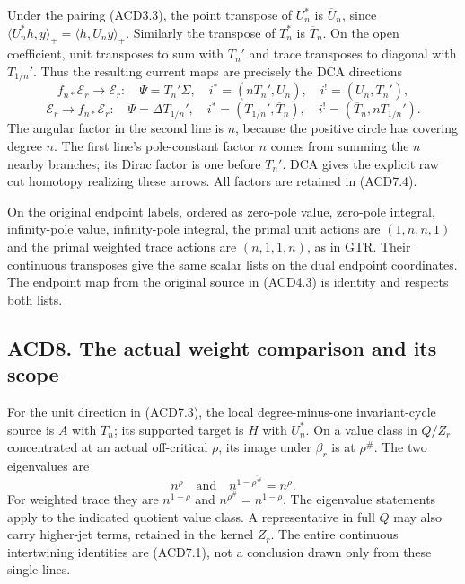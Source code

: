 Under the pairing (ACD3.3), the point transpose of \(U_n^*\) is
\(\overline U_n\), since
\(\langle U_n^*h,y\rangle_+=\langle h,U_ny\rangle_+\). Similarly the
transpose of \(T_n^*\) is \(\overline T_n\). On the open coefficient,
unit transposes to sum with \(T_n'\) and trace transposes to diagonal
with \(T_{1/n}'\). Thus the resulting current maps are precisely the DCA
directions \[
f_{n*}\mathscr E_r\to\mathscr E_r:
\quad\Psi=T_n'\Sigma,\quad i^*=(nT_n',\overline U_n),
\quad i^!=(\overline U_n,T_n'),
\] \[
\mathscr E_r\to f_{n*}\mathscr E_r:
\quad\Psi=\Delta T_{1/n}',\quad i^*=(T_{1/n}',\overline T_n),
\quad i^!=(\overline T_n,nT_{1/n}').
\tag{ACD7.4}
\] The angular factor in the second line is \(n\), because the positive
circle has covering degree \(n\). The first line's pole-constant factor
\(n\) comes from summing the \(n\) nearby branches; its Dirac factor is
one before \(T_n'\). DCA gives the explicit raw cut homotopy realizing
these arrows. All factors are retained in (ACD7.4).

On the original endpoint labels, ordered as zero-pole value, zero-pole
integral, infinity-pole value, infinity-pole integral, the primal unit
actions are \((1,n,n,1)\) and the primal weighted trace actions are
\((n,1,1,n)\), as in GTR. Their continuous transposes give the same
scalar lists on the dual endpoint coordinates. The endpoint map from the
original source in (ACD4.3) is identity and respects both lists.

\subsection{ACD8. The actual weight comparison and its
scope}\label{acd8.-the-actual-weight-comparison-and-its-scope}

For the unit direction in (ACD7.3), the local degree-minus-one
invariant-cycle source is \(A\) with \(T_n\); its supported target is
\(H\) with \(U_n^*\). On a value class in \(Q/Z_r\) concentrated at an
actual off-critical \(\rho\), its image under \(\beta_r\) is at
\(\rho^\#\). The two eigenvalues are \[
n^\rho\quad\text{and}\quad n^{1-\overline{\rho^\#}}=n^\rho.
\tag{ACD8.1}
\] For weighted trace they are \(n^{1-\rho}\) and
\(n^{\overline{\rho^\#}}=n^{1-\rho}\). The eigenvalue statements apply
to the indicated quotient value class. A representative in full \(Q\)
may also carry higher-jet terms, retained in the kernel \(Z_r\). The
entire continuous intertwining identities are (ACD7.1), not a conclusion
drawn only from these single lines.

